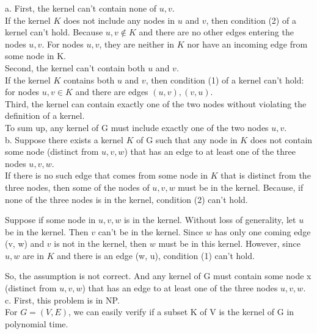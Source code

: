 \documentclass[12pt]{article}
\begin{document}
a. First, the kernel can't contain none of $u, v$. \\

If the kernel $K$ does not include any nodes in $u$ and $v$, then
condition (2) of a kernel can't hold. Because $u,v \notin K$ and there
are no other edges entering the nodes $u, v$. For nodes $u, v$, they
are neither in $K$ nor have an incoming edge from some node in K. \\

Second, the kernel can't contain both $u$ and $v$. \\

If the kernel $K$ contains both $u$ and $v$, then condition (1) of a
kernel can't hold: for nodes $u,v \in K$ and there are edges
$(u,v), (v,u)$. \\

Third, the kernel can contain exactly one of the two nodes without
violating the definition of a kernel. \\

To sum up, any kernel of G must include exactly one of the two nodes
$u,v$. \\

b. Suppose there exists a kernel $K$ of G such that any node in $K$
does not contain some node (distinct from $u, v, w$) that has an edge
to at least one of the three nodes $u, v, w$. \\ 

If there is no such edge that comes from some node in $K$ that is
distinct from the three nodes, then some of the nodes of $u, v, w$
must be in the kernel. Because, if none of the three nodes is in the
kernel, condition (2) can't hold.

Suppose if some node in $u, v, w$ is in the kernel. Without loss of
generality, let $u$ be in the kernel. Then $v$ can't be in the
kernel. Since $w$ has only one coming edge (v, w) and $v$ is not in
the kernel, then $w$ must be in this kernel. However, since $u, w$
are in $K$ and there is an edge (w, u), condition (1) can't hold.

So, the assumption is not correct. And any kernel of G must contain
some node x (distinct from $u, v, w$) that has an edge to at least one
of the three nodes $u, v, w$. \\ 

c. First, this problem is in NP. \\

For $G=(V,E)$, we can easily verify if a subset K of V is the kernel
of G in polynomial time. \\
\end{document}
